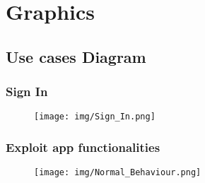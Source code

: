 \section{Graphics}
\label{sec:graph}

\subsection{Use cases Diagram}

\begin{landscape}

\subsubsection{Sign In}

\begin{figure}[h!]

  \centering

  \texttt{[image: img/Sign\_In.png]}


  \label{fig:label}

 \end{figure}

\clearpage

\subsubsection{Exploit app functionalities}

\begin{figure}[h!]

  \centering

  \texttt{[image: img/Normal\_Behaviour.png]}


  \label{fig:label}

 \end{figure}

\end{landscape}



